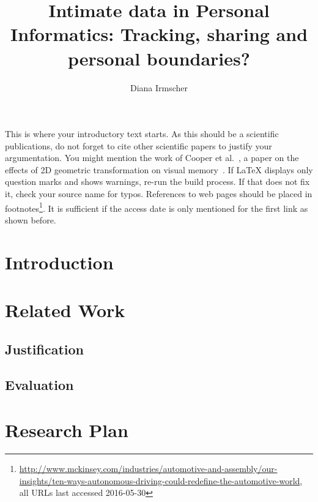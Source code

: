 \documentclass[journal]{vgtc}                %
\title{Intimate data in Personal Informatics: Tracking, sharing and personal boundaries?}
\author{Diana Irmscher}
\begin{document}

\maketitle

%
%

This is where your introductory text starts. As this should be a scientific publications, do not forget to cite other scientific papers to justify your argumentation. You might mention the work of Cooper et al.~\cite{Cooper2006}, a paper on the effects of 2D geometric transformation on visual memory~\cite{Lam2006}. If LaTeX displays only question marks \cite{IWonderIfThisSourceExists2013} and shows warnings, re-run the build process. If that does not fix it, check your source name for typos. References to web pages should be placed in footnotes\footnote{\url{http://www.mckinsey.com/industries/automotive-and-assembly/our-insights/ten-ways-autonomous-driving-could-redefine-the-automotive-world}, \newline all URLs last accessed 2016-05-30}. It is sufficient if the access date is only mentioned for the first link as shown before.

\section{Introduction}

\section{Related Work}

\subsection{Justification}

\subsection{Evaluation}

\section{Research Plan}
\end{document}
